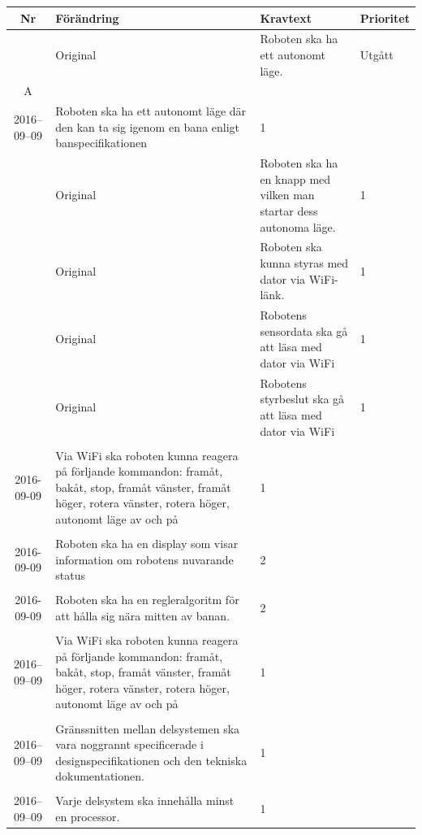 \documentclass[a4paper,titlepage,12pt]{article}
\newcounter{reqNr}
\newcommand{\nextReqNr}{\stepcounter{reqNr}\arabic{reqNr}}
\newcounter{reqNrII}
\newcommand{\nextReqNrII}{\stepcounter{reqNrII}\arabic{reqNrII}}
\newcommand{\newContent}[1] {\pbox{5cm}{Nytt innehåll i \arabic{reqNr}\\#1}}
\newcommand{\newRequirement}[1] {\pbox{5cm}{Tillagt \\#1}}
\begin{document}
		\begin{longtable}[c]{ c l>{\raggedright}p{} l }
			\textbf{Nr} & \textbf{Förändring} & \textbf{Kravtext} & \textbf{Prioritet} 
				\\ \midrule
			\nextReqNr{} & Original & Roboten ska ha ett autonomt läge. & Utgått
					\\ \midrule
	
			\arabic{reqNr}A & \newContent{2016--09--09} & Roboten ska ha ett autonomt läge där den kan ta
					sig igenom en bana enligt banspecifikationen & 1
					\\ \midrule

			\nextReqNr{} & Original & Roboten ska ha en knapp med vilken man startar 
				dess autonoma läge. & 1
				\\ \midrule

			\nextReqNr{} & Original & Roboten ska kunna styras med dator 
				via WiFi-länk. & 1
				\\ \midrule
		
			\nextReqNr{} & Original & Robotens sensordata ska gå att läsa 
				med dator via WiFi & 1
				\\ \midrule

			\nextReqNr{} & Original & Robotens styrbeslut ska gå att läsa 
				med dator via WiFi & 1
                \\ \midrule
      
			\nextReqNrII & \newRequirement{2016-09-09} & Via WiFi ska roboten kunna reagera på förljande
				kommandon: framåt, bakåt, stop, framåt vänster,
				framåt höger, rotera vänster, rotera höger,
				autonomt läge av och på & 1
				\\ \hline

			\nextReqNrII & \newRequirement{2016-09-09} & Roboten ska ha en display som visar information
				om robotens nuvarande status & 2
				\\ \hline

			\nextReqNrII & \newRequirement{2016-09-09} & Roboten ska ha en regleralgoritm för att hålla sig
				nära mitten av banan. & 2
				\\ \hline

			\nextReqNrII{} & \newRequirement{2016--09--09} & Via WiFi ska roboten kunna reagera på förljande
                              kommandon: framåt, bakåt, stop, framåt vänster,
                              framåt höger, rotera vänster, rotera höger,
                              autonomt läge av och på & 1
                \\ \midrule

            \nextReqNrII{} & \newRequirement{2016--09--09} & Gränssnitten
            mellan delsystemen ska vara noggrannt specificerade i
            designspecifikationen och den tekniska dokumentationen. & 1
                \\ \midrule

            \nextReqNrII{} & \newRequirement{2016--09--09} & Varje delsystem
            ska innehålla minst en processor. & 1
				\\ 
		\end{longtable}
\end{document}
